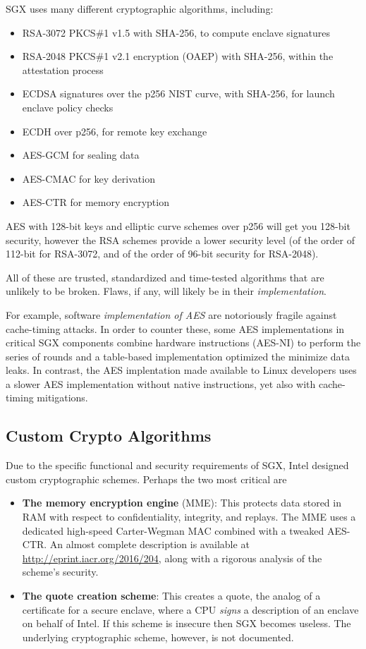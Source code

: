 \documentclass[]{article}
\begin{document}
SGX uses many different cryptographic algorithms, including:

\begin{itemize}
\item
  RSA-3072 PKCS\#1 v1.5 with SHA-256, to compute enclave signatures
\item
  RSA-2048 PKCS\#1 v2.1 encryption (OAEP) with SHA-256, within the
  attestation process
\item
  ECDSA signatures over the p256 NIST curve, with SHA-256, for launch
  enclave policy checks
\item
  ECDH over p256, for remote key exchange
\item
  AES-GCM for sealing data
\item
  AES-CMAC for key derivation
\item
  AES-CTR for memory encryption
\end{itemize}

AES with 128-bit keys and elliptic curve schemes over p256 will get you
128-bit security, however the RSA schemes provide a lower security level
(of the order of 112-bit for RSA-3072, and of the order of 96-bit
security for RSA-2048).

All of these are trusted, standardized and time-tested algorithms that
are unlikely to be broken. Flaws, if any, will likely be in their
\emph{implementation}.

For example, software \emph{implementation of AES} are notoriously
fragile against cache-timing attacks. In order to counter these, some
AES implementations in critical SGX components combine hardware
instructions (AES-NI) to perform the series of rounds and a table-based
implementation optimized the minimize data leaks. In contrast, the AES
implentation made available to Linux developers uses a slower AES
implementation without native instructions, yet also with cache-timing
mitigations.

\subsection{Custom Crypto Algorithms}\label{custom-crypto-algorithms}

Due to the specific functional and security requirements of SGX, Intel
designed custom cryptographic schemes. Perhaps the two most critical are

\begin{itemize}
\item
  \textbf{The memory encryption engine} (MME): This protects data stored
  in RAM with respect to confidentiality, integrity, and replays. The
  MME uses a dedicated high-speed Carter-Wegman MAC combined with a
  tweaked AES-CTR. An almost complete description is available at
  \url{http://eprint.iacr.org/2016/204}, along with a rigorous analysis
  of the scheme's security.
\item
  \textbf{The quote creation scheme}: This creates a quote, the analog
  of a certificate for a secure enclave, where a CPU \emph{signs} a
  description of an enclave on behalf of Intel. If this scheme is
  insecure then SGX becomes useless. The underlying cryptographic
  scheme, however, is not documented.
\end{itemize}
\end{document}
